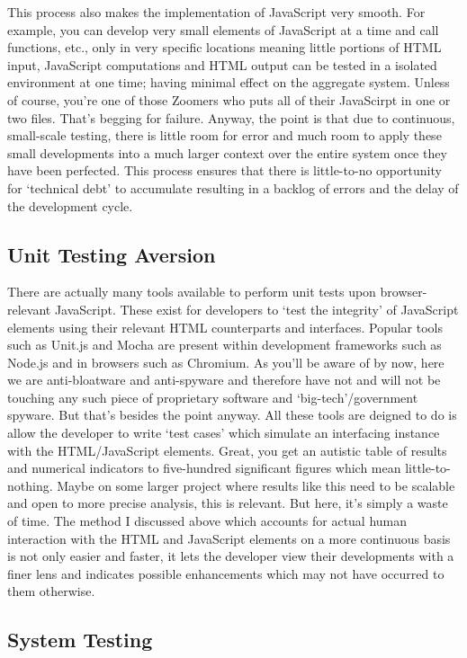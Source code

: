 \documentclass[11pt, english]{article}
\begin{document}
	This process also makes the implementation of JavaScript very smooth. For example, you can develop very small elements of JavaScript at a time and call functions, etc., only in very specific locations meaning little portions of HTML input, JavaScript computations and HTML output can be tested in a isolated environment at one time; having minimal effect on the aggregate system. Unless of course, you're one of those Zoomers who puts all of their JavaScirpt in one or two files. That's begging for failure. Anyway, the point is that due to continuous, small-scale testing, there is little room for error and much room to apply these small developments into a much larger context over the entire system once they have been perfected. This process ensures that there is little-to-no opportunity for `technical debt' to accumulate resulting in a backlog of errors and the delay of the development cycle.

	\subsection{Unit Testing Aversion}

	There are actually many tools available to perform unit tests upon browser-relevant JavaScript. These exist for developers to `test the integrity' of JavaScript elements using their relevant HTML counterparts and interfaces. Popular tools such as Unit.js and Mocha are present within development frameworks such as Node.js and in browsers such as Chromium. As you'll be aware of by now, here we are anti-bloatware and anti-spyware and therefore have not and will not be touching any such piece of proprietary software and `big-tech'/government spyware. But that's besides the point anyway. All these tools are deigned to do is allow the developer to write `test cases' which simulate an interfacing instance with the HTML/JavaScript elements. Great, you get an autistic table of results and numerical indicators to five-hundred significant figures which mean little-to-nothing. Maybe on some larger project where results like this need to be scalable and open to more precise analysis, this is relevant. But here, it's simply a waste of time. The method I discussed above which accounts for actual human interaction with the HTML and JavaScript elements on a more continuous basis is not only easier and faster, it lets the developer view their developments with a finer lens and indicates possible enhancements which may not have occurred to them otherwise. 

	\subsection{System Testing}
\end{document}
